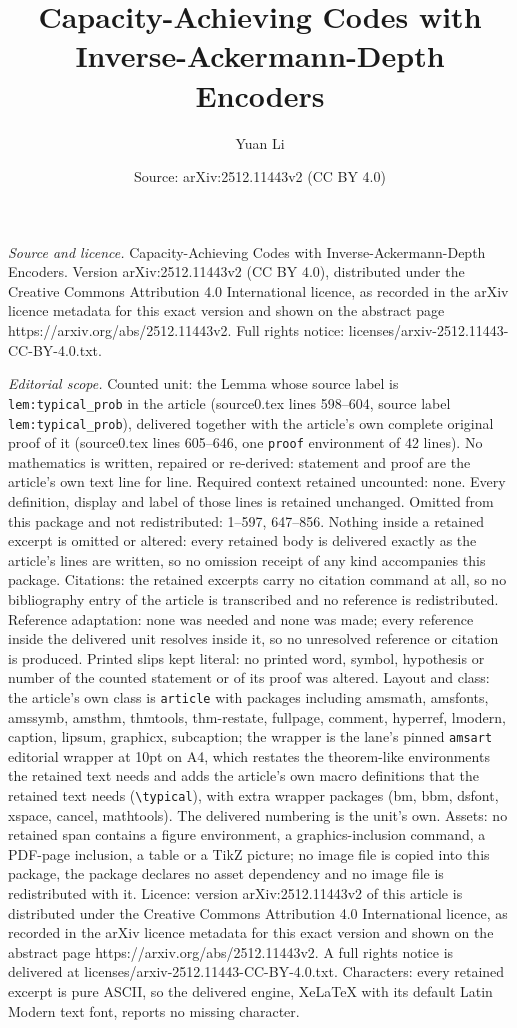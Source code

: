 \documentclass[10pt,a4paper]{amsart}
\title[Capacity-Achieving Codes with Inverse-Ackermann-Depth Encode]{Capacity-Achieving Codes with Inverse-Ackermann-Depth Encoders}
\author{Yuan Li}
\date{Source: arXiv:2512.11443v2 (CC BY 4.0)}
\begin{document}
\maketitle

\noindent\emph{Source and licence.} Capacity-Achieving Codes with Inverse-Ackermann-Depth Encoders. Version arXiv:2512.11443v2 (CC BY 4.0), distributed under the Creative Commons Attribution 4.0 International licence, as recorded in the arXiv licence metadata for this exact version and shown on the abstract page https://arxiv.org/abs/2512.11443v2. Full rights notice: licenses/arxiv-2512.11443-CC-BY-4.0.txt.\par\smallskip

\noindent\textit{Editorial scope.} Counted unit: the Lemma whose source label is \texttt{lem:typical\_prob} in the article (source0.tex lines 598--604, source label \texttt{lem:typical\_prob}), delivered together with the article's own complete original proof of it (source0.tex lines 605--646, one \texttt{proof} environment of 42 lines). No mathematics is written, repaired or re-derived: statement and proof are the article's own text line for line. Required context retained uncounted: none. Every definition, display and label of those lines is retained unchanged. Omitted from this package and not redistributed: 1--597, 647--856. Nothing inside a retained excerpt is omitted or altered: every retained body is delivered exactly as the article's lines are written, so no omission receipt of any kind accompanies this package. Citations: the retained excerpts carry no citation command at all, so no bibliography entry of the article is transcribed and no reference is redistributed. Reference adaptation: none was needed and none was made; every reference inside the delivered unit resolves inside it, so no unresolved reference or citation is produced. Printed slips kept literal: no printed word, symbol, hypothesis or number of the counted statement or of its proof was altered. Layout and class: the article's own class is \texttt{article} with packages including amsmath, amsfonts, amssymb, amsthm, thmtools, thm-restate, fullpage, comment, hyperref, lmodern, caption, lipsum, graphicx, subcaption; the wrapper is the lane's pinned \texttt{amsart} editorial wrapper at 10pt on A4, which restates the theorem-like environments the retained text needs and adds the article's own macro definitions that the retained text needs (\texttt{\textbackslash typical}), with extra wrapper packages (bm, bbm, dsfont, xspace, cancel, mathtools). The delivered numbering is the unit's own. Assets: no retained span contains a figure environment, a graphics-inclusion command, a PDF-page inclusion, a table or a TikZ picture; no image file is copied into this package, the package declares no asset dependency and no image file is redistributed with it. Licence: version arXiv:2512.11443v2 of this article is distributed under the Creative Commons Attribution 4.0 International licence, as recorded in the arXiv licence metadata for this exact version and shown on the abstract page https://arxiv.org/abs/2512.11443v2. A full rights notice is delivered at licenses/arxiv-2512.11443-CC-BY-4.0.txt. Characters: every retained excerpt is pure ASCII, so the delivered engine, XeLaTeX with its default Latin Modern text font, reports no missing character.
\end{document}

